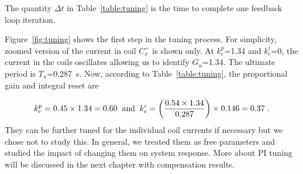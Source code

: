 The quantity $\Delta t$ in Table~\ref{table:tuning} is the time to complete one feedback loop iteration.

Figure~\ref{fig:tuning} shows the first step in the tuning process. For simplicity, zoomed version of the current in coil $C_x^+$ is shown only. At $k_c^p$=1.34 and $k_c^i$=0, the current in the coils oscillates allowing us to identify $G_u$=1.34.  The ultimate period is $T_u$=0.287~s. Now, according to Table~\ref{table:tuning}, the proportional gain and integral reset are

\begin{equation}
    k_c^p=0.45\times1.34=0.60\;\;\text{and}\;\; k_c^i=\left(\frac{0.54 \times1.34}{0.287}\right)\times0.146=0.37~{\rm .}
\end{equation}
They can be further tuned for the individual coil currents if necessary but we chose not to study this. In general, we treated them as free parameters and studied the impact of changing them on system response. More about PI tuning will be discussed in the next chapter with compensation results.








 
